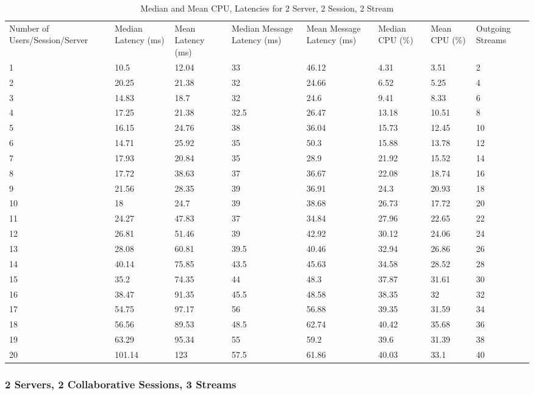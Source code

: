 \begin{table}
\caption{Median and Mean CPU, Latencies for 2 Server, 2 Session, 2 Stream}
\label{table:2serv_2sess_2str}
\begin{tabu} to\linewidth{|X[c]|X[c]|X[c]|X[c]|X[c]|X[c]|X[c]|X[c]|}
\everyrow{\hline}
\hline
Number of Users/Session/Server & Median Latency (ms) & Mean Latency (ms) & Median Message Latency (ms) & Mean Message Latency (ms) & Median CPU (\%) & Mean CPU (\%) & Outgoing Streams\\
1 & 10.5 & 12.04 & 33 & 46.12 & 4.31 & 3.51 & 2 \\
2 & 20.25 & 21.38 & 32 & 24.66 & 6.52 & 5.25 & 4 \\
3 & 14.83 & 18.7 & 32 & 24.6 & 9.41 & 8.33 & 6 \\
4 & 17.25 & 21.38 & 32.5 & 26.47 & 13.18 & 10.51 & 8 \\
5 & 16.15 & 24.76 & 38 & 36.04 & 15.73 & 12.45 & 10 \\
6 & 14.71 & 25.92 & 35 & 50.3 & 15.88 & 13.78 & 12 \\
7 & 17.93 & 20.84 & 35 & 28.9 & 21.92 & 15.52 & 14 \\
8 & 17.72 & 38.63 & 37 & 36.67 & 22.08 & 18.74 & 16 \\
9 & 21.56 & 28.35 & 39 & 36.91 & 24.3 & 20.93 & 18 \\
10 & 18 & 24.7 & 39 & 38.68 & 26.73 & 17.72 & 20 \\
11 & 24.27 & 47.83 & 37 & 34.84 & 27.96 & 22.65 & 22 \\
12 & 26.81 & 51.46 & 39 & 42.92 & 30.12 & 24.06 & 24 \\
13 & 28.08 & 60.81 & 39.5 & 40.46 & 32.94 & 26.86 & 26 \\
14 & 40.14 & 75.85 & 43.5 & 45.63 & 34.58 & 28.52 & 28 \\
15 & 35.2 & 74.35 & 44 & 48.3 & 37.87 & 31.61 & 30 \\
16 & 38.47 & 91.35 & 45.5 & 48.58 & 38.35 & 32 & 32 \\
17 & 54.75 & 97.17 & 56 & 56.88 & 39.35 & 31.59 & 34 \\
18 & 56.56 & 89.53 & 48.5 & 62.74 & 40.42 & 35.68 & 36 \\
19 & 63.29 & 95.34 & 55 & 59.2 & 39.6 & 31.39 & 38 \\
20 & 101.14 & 123 & 57.5 & 61.86 & 40.03 & 33.1 & 40 \\
\end{tabu}
\end{table}

\clearpage\subsubsection{2 Servers, 2 Collaborative Sessions, 3 Streams}

